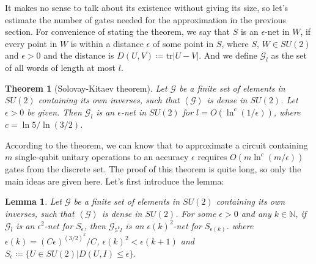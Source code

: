 \documentclass[a4paper,10pt]{book}
\newtheorem{theorem}{Theorem}[section]
\newtheorem{lemma}{Lemma}[section]
\numberwithin{equation}{section}
\begin{document}
It makes no sense to talk about its existence without giving its size,  so let's estimate the number of gates needed for the approximation in the previous section. For convenience of stating the theorem, we say that $S$ is an $\epsilon$-net in $W$, if every point in $W$ is within a distance $\epsilon$ of some point in $S$, where $S$, $W\in SU(2)$ and $\epsilon>0$ and the distance is $D(U,V)\coloneqq\mathrm{tr}|U-V|$. And we define $\mathcal{G}_{l}$ as the set of all words of length at most $l$.
\begin{theorem}[Solovay-Kitaev theorem]
    Let $\mathcal{G}$ be a finite set of elements in $SU(2)$ containing its own inverses, such that $\left\langle\mathcal{G}\right\rangle$ is dense in $SU(2)$. Let $\epsilon > 0$ be given. Then $\mathcal{G}_{l}$ is an $\epsilon$-net in $SU(2)$ for $l=O(\ln^{c}(1/\epsilon))$, where $c=\ln5/\ln(3/2)$.
\end{theorem}
According to the theorem, we can know that to approximate a circuit containing $m$ single-qubit unitary operations to an accuracy $\epsilon$ requires $O(m\ln^{c}(m/\epsilon))$ gates from the discrete set. The proof of this theorem is quite long, so only the main ideas are given here. Let's first introduce the lemma:
\begin{lemma}
    Let $\mathcal{G}$ be a finite set of elements in $SU(2)$ containing its own inverses, such that $\left\langle\mathcal{G}\right\rangle$ is dense in $SU(2)$. For some $\epsilon>0$ and any $k\in\mathbb{N}$, if $\mathcal{G}_{l}$ is an $\epsilon^{2}$-net for $S_{\epsilon}$, then $\mathcal{G}_{5^{k}l}$ is an $\epsilon(k)^{2}$-net for $S_{\epsilon(k)}$. where $\epsilon(k)=(C\epsilon)^{(3/2)^{k}}/C$, $\epsilon(k)^{2}<\epsilon(k+1)$ and $S_{\epsilon}\coloneqq \{U\in SU(2)|D(U,I)\leq \epsilon\}$.
\end{lemma}
\end{document}
